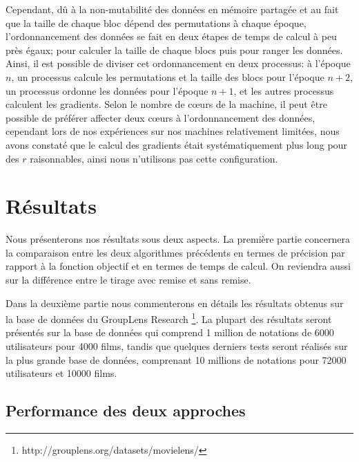 \documentclass[10pt,a4paper]{article}
\begin{document}
Cependant, dû à la non-mutabilité des données en mémoire partagée et au fait que la taille de chaque bloc dépend des permutations à chaque époque, l'ordonnancement des données se fait en deux étapes de temps de calcul à peu près égaux; pour calculer la taille de chaque blocs puis pour ranger les données. Ainsi, il est possible de diviser cet ordonnancement en deux processus: à l'époque $n$, un processus calcule les permutations et la taille des blocs pour l'époque $n+2$, un processus ordonne les données pour l'époque $n+1$, et les autres processus calculent les gradients. Selon le nombre de cœurs de la machine, il peut être possible de préférer affecter deux cœurs à l'ordonnancement des données, cependant lors de nos expériences sur nos machines relativement limitées, nous avons constaté que le calcul des gradients était systématiquement plus long pour des $r$ raisonnables, ainsi nous n'utilisons pas cette configuration.

\section{Résultats}

Nous présenterons nos résultats sous deux aspects. La première partie concernera la comparaison entre les deux algorithmes précédents en termes de précision par rapport à la fonction objectif et en termes de temps de calcul. On reviendra aussi sur la différence entre le tirage avec remise et sans remise.

 Dans la deuxième partie nous commenterons en détails les résultats obtenus sur la base de données du GroupLens Research \footnote{http://grouplens.org/datasets/movielens/}. La plupart des résultats seront présentés sur la base de données qui comprend 1 million de notations de 6000 utilisateurs pour 4000 films, tandis que quelques derniers tests seront réalisés sur la plus grande base de données, comprenant 10 millions de notations pour 72000 utilisateurs et 10000 films.

\subsection{Performance des deux approches}
\end{document}
